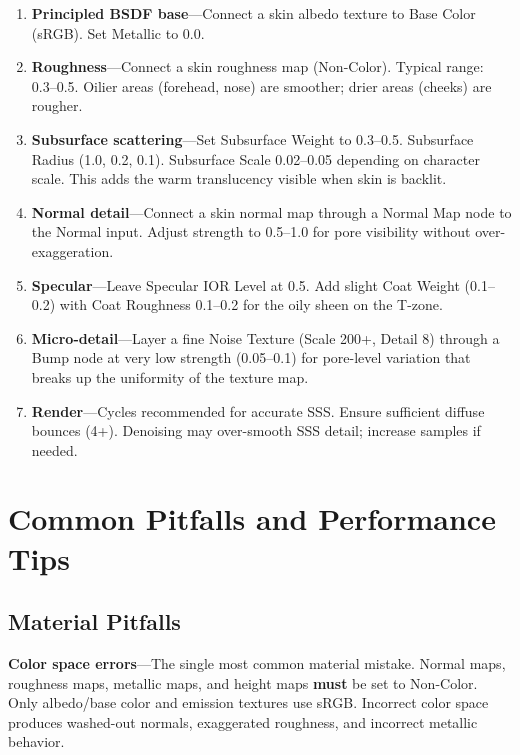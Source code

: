 \begin{enumerate}[leftmargin=2em]
  \item \textbf{Principled BSDF base}---Connect a skin albedo texture
        to Base Color (sRGB). Set Metallic to 0.0.
  \item \textbf{Roughness}---Connect a skin roughness map (Non-Color).
        Typical range: 0.3--0.5. Oilier areas (forehead, nose) are
        smoother; drier areas (cheeks) are rougher.
  \item \textbf{Subsurface scattering}---Set Subsurface Weight to
        0.3--0.5. Subsurface Radius (1.0, 0.2, 0.1). Subsurface
        Scale 0.02--0.05 depending on character scale. This adds the
        warm translucency visible when skin is backlit.
  \item \textbf{Normal detail}---Connect a skin normal map through
        a Normal Map node to the Normal input. Adjust strength to
        0.5--1.0 for pore visibility without over-exaggeration.
  \item \textbf{Specular}---Leave Specular IOR Level at 0.5. Add
        slight Coat Weight (0.1--0.2) with Coat Roughness 0.1--0.2
        for the oily sheen on the T-zone.
  \item \textbf{Micro-detail}---Layer a fine Noise Texture (Scale
        200+, Detail 8) through a Bump node at very low strength
        (0.05--0.1) for pore-level variation that breaks up the
        uniformity of the texture map.
  \item \textbf{Render}---Cycles recommended for accurate SSS.
        Ensure sufficient diffuse bounces (4+). Denoising may
        over-smooth SSS detail; increase samples if needed.
\end{enumerate}


\section{Common Pitfalls and Performance Tips}
\label{sec:shading:pitfalls}

\subsection{Material Pitfalls}

\begin{warningbox}
\textbf{Color space errors}---The single most common material
mistake. Normal maps, roughness maps, metallic maps, and height
maps \textbf{must} be set to Non-Color. Only albedo/base color and
emission textures use sRGB. Incorrect color space produces
washed-out normals, exaggerated roughness, and incorrect metallic
behavior.
\end{warningbox}

